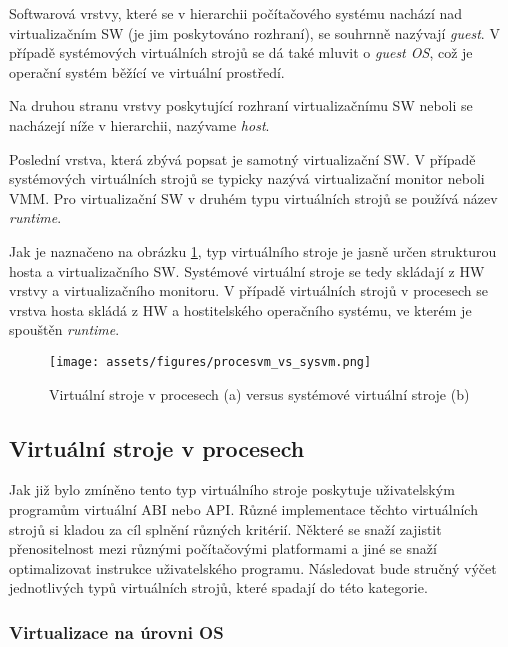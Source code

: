   Softwarová vrstvy, které se v hierarchii počítačového systému nachází nad virtualizačním SW (je jim poskytováno rozhraní), se souhrnně nazývají \textit{guest}. V případě systémových virtuálních strojů se dá také 
  mluvit o \textit{guest OS}, což je operační systém běžící ve virtuální prostředí.
  
  Na druhou stranu vrstvy poskytující rozhraní virtualizačnímu SW neboli se nacházejí níže v hierarchii, nazývame \textit{host}. 
  
  Poslední vrstva, která zbývá popsat je samotný virtualizační SW. V případě systémových virtuálních strojů se typicky nazývá virtualizační monitor neboli VMM. Pro virtualizační SW v druhém typu virtuálních strojů se
  používá název \textit{runtime}. 
  
  Jak je naznačeno na obrázku \ref{figure:computer_architecture}, typ virtuálního stroje je jasně určen strukturou hosta a virtualizačního SW. Systémové virtuální stroje se tedy skládají z HW vrstvy a virtualizačního
  monitoru. V případě virtuálních strojů v procesech se vrstva hosta skládá z HW a hostitelského operačního systému, ve kterém je spouštěn \textit{runtime}.

  \begin{figure}
    \centering
    \texttt{[image: assets/figures/procesvm\_vs\_sysvm.png]}
    \caption[Virtuální stroj v procesu versus systémové virtuální stroje ]{Virtuální stroje v procesech (a) versus systémové virtuální stroje (b) \cite{book:iee:vm_architecture}}
    \label{figure:computer_architecture}
  \end{figure}
  
  
  \subsection{Virtuální stroje v procesech}
  \label{subsection:proces_vm}
  
  Jak již bylo zmíněno tento typ virtuálního stroje poskytuje uživatelským programům virtuální ABI nebo API. Různé implementace těchto virtuálních strojů si kladou za cíl splnění různých kritérií. Některé se snaží
  zajistit přenositelnost mezi různými počítačovými platformami a jiné se snaží optimalizovat instrukce uživatelského programu. Následovat bude stručný výčet jednotlivých typů virtuálních strojů, které spadají 
  do této kategorie.      
  
    \subsubsection*{Virtualizace na úrovni OS}
    \label{subsubsection:os_level_virtualization}
    
